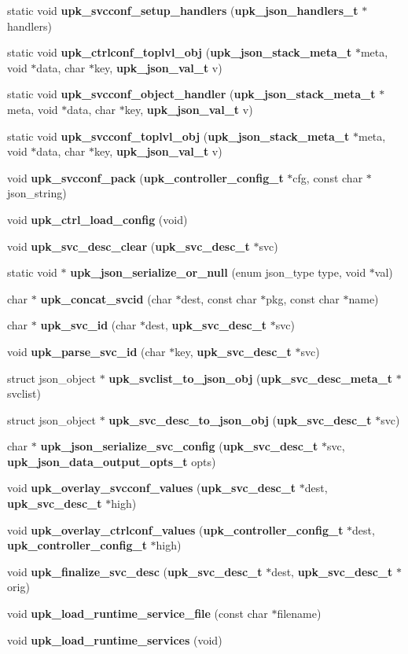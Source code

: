 \begin{DoxyCompactItemize}
static void {\bf upk\_\-svcconf\_\-setup\_\-handlers} ({\bf upk\_\-json\_\-handlers\_\-t} $\ast$handlers)
\item 
static void {\bf upk\_\-ctrlconf\_\-toplvl\_\-obj} ({\bf upk\_\-json\_\-stack\_\-meta\_\-t} $\ast$meta, void $\ast$data, char $\ast$key, {\bf upk\_\-json\_\-val\_\-t} v)
\item 
static void {\bf upk\_\-svcconf\_\-object\_\-handler} ({\bf upk\_\-json\_\-stack\_\-meta\_\-t} $\ast$meta, void $\ast$data, char $\ast$key, {\bf upk\_\-json\_\-val\_\-t} v)
\item 
static void {\bf upk\_\-svcconf\_\-toplvl\_\-obj} ({\bf upk\_\-json\_\-stack\_\-meta\_\-t} $\ast$meta, void $\ast$data, char $\ast$key, {\bf upk\_\-json\_\-val\_\-t} v)
\item 
void {\bf upk\_\-svcconf\_\-pack} ({\bf upk\_\-controller\_\-config\_\-t} $\ast$cfg, const char $\ast$json\_\-string)
\item 
void {\bf upk\_\-ctrl\_\-load\_\-config} (void)
\item 
void {\bf upk\_\-svc\_\-desc\_\-clear} ({\bf upk\_\-svc\_\-desc\_\-t} $\ast$svc)
\item 
static void $\ast$ {\bf upk\_\-json\_\-serialize\_\-or\_\-null} (enum json\_\-type type, void $\ast$val)
\item 
char $\ast$ {\bf upk\_\-concat\_\-svcid} (char $\ast$dest, const char $\ast$pkg, const char $\ast$name)
\item 
char $\ast$ {\bf upk\_\-svc\_\-id} (char $\ast$dest, {\bf upk\_\-svc\_\-desc\_\-t} $\ast$svc)
\item 
void {\bf upk\_\-parse\_\-svc\_\-id} (char $\ast$key, {\bf upk\_\-svc\_\-desc\_\-t} $\ast$svc)
\item 
struct json\_\-object $\ast$ {\bf upk\_\-svclist\_\-to\_\-json\_\-obj} ({\bf upk\_\-svc\_\-desc\_\-meta\_\-t} $\ast$svclist)
\item 
struct json\_\-object $\ast$ {\bf upk\_\-svc\_\-desc\_\-to\_\-json\_\-obj} ({\bf upk\_\-svc\_\-desc\_\-t} $\ast$svc)
\item 
char $\ast$ {\bf upk\_\-json\_\-serialize\_\-svc\_\-config} ({\bf upk\_\-svc\_\-desc\_\-t} $\ast$svc, {\bf upk\_\-json\_\-data\_\-output\_\-opts\_\-t} opts)
\item 
void {\bf upk\_\-overlay\_\-svcconf\_\-values} ({\bf upk\_\-svc\_\-desc\_\-t} $\ast$dest, {\bf upk\_\-svc\_\-desc\_\-t} $\ast$high)
\item 
void {\bf upk\_\-overlay\_\-ctrlconf\_\-values} ({\bf upk\_\-controller\_\-config\_\-t} $\ast$dest, {\bf upk\_\-controller\_\-config\_\-t} $\ast$high)
\item 
void {\bf upk\_\-finalize\_\-svc\_\-desc} ({\bf upk\_\-svc\_\-desc\_\-t} $\ast$dest, {\bf upk\_\-svc\_\-desc\_\-t} $\ast$orig)
\item 
void {\bf upk\_\-load\_\-runtime\_\-service\_\-file} (const char $\ast$filename)
\item 
void {\bf upk\_\-load\_\-runtime\_\-services} (void)
\end{DoxyCompactItemize}
